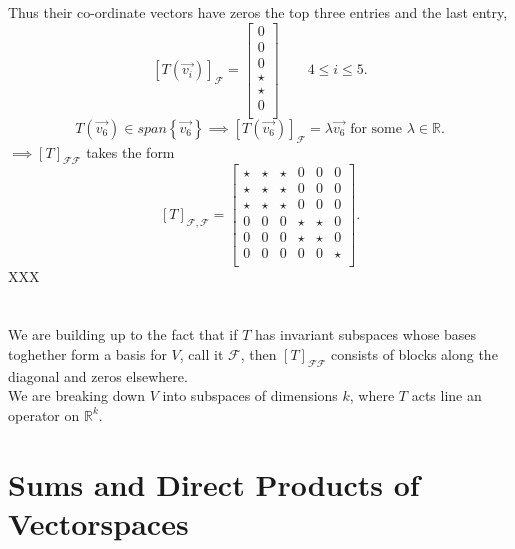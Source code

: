 \documentclass{report}
\begin{document}
Thus their co-ordinate vectors have zeros the top three entries and the last entry, 
\[
	\left[ T \left( \vec{ v_i}  \right)  \right] _{ \mathcal{F}} = \begin{bmatrix}
		0\\
		 0\\
		 0\\
	\star\\
	\star\\
	0\\
	\end{bmatrix}
	   \qquad  4 \leq i \leq 5
.\] 
\[
T \left(  \vec{ v_6}  \right) \in span \left\{ \vec{ v_6}  \right\} \implies \left[ T \left( \vec{ v_6}  \right)  \right] _{ \mathcal{F}} = \lambda \vec{ v_6} \text{ for some } \lambda \in \mathbb{R}
.\] 
$ \implies \left[ T \right] _{ \mathcal{F} \mathcal{F}}$ takes the form
\[
	\left[ T \right] _{ \mathcal{F} , \mathcal{F}} = \begin{bmatrix}
		\star & \star & \star & 0 & 0 & 0\\
		\star & \star & \star & 0 & 0 & 0\\
		\star & \star & \star & 0 & 0 & 0\\
		0 & 0 & 0 & \star & \star & 0\\
		0 & 0 & 0 & \star & \star & 0\\
		0 & 0 & 0 & 0 & 0 & \star\\
	\end{bmatrix}
.\]
XXX  \\
\\
\\
We are building up to the fact that if $ T$ has invariant subspaces whose bases toghether form a basis for $ V$, call it $  \mathcal{F}$, then $ \left[ T \right] _{ \mathcal{F} \mathcal{F}}$ consists of blocks along the diagonal and zeros elsewhere.\\
We are breaking down $ V$ into subspaces of dimensions $ k$, where $ T$ acts line an operator on $ \mathbb{R} ^{ k}$.\\
\section{Sums and Direct Products of Vectorspaces}
\end{document}
